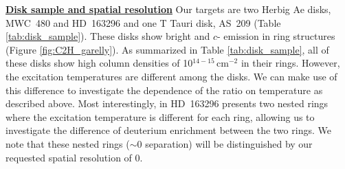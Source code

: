 \documentclass[12pt,a4paper]{article}  %
\begin{document}
\vspace{1em}
\noindent
\textbf{\underline{Disk sample and spatial resolution}}
Our targets are two Herbig Ae disks, MWC~480 and HD~163296 and one T Tauri disk, AS~209 (Table \ref{tab:disk_sample}). These disks show bright  and $c$- emission in ring structures (Figure \ref{fig:C2H_garelly}). As summarized in Table \ref{tab:disk_sample}, all of these disks show high  column densities of 10$^{14-15}$\,cm$^{-2}$ in their rings. However, the excitation temperatures are different among the disks. We can make use of this difference to investigate the dependence of the  ratio on temperature as described above. Most interestingly,  in HD~163296 presents two nested rings where the excitation temperature is different for each ring, allowing us to investigate the difference of deuterium enrichment between the two rings. We note that these nested rings ($\sim$0 separation) will be distinguished by our requested spatial resolution of 0. %
\end{document}
